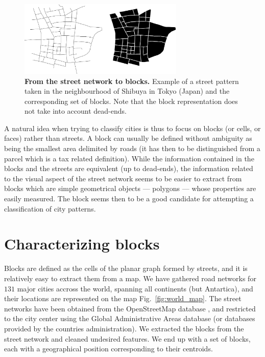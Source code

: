 \begin{figure}
    \centering
    \includegraphics[width=0.7\textwidth]{./gfx/chapter-networks/example.pdf}
    \caption{{\bf From the street network to blocks.} Example of a street pattern
    taken in the neighbourhood of Shibuya in Tokyo (Japan) and the corresponding set
    of blocks. Note that the block representation does not take into account
    dead-ends.  \label{fig:example}} 
\end{figure}

A natural idea when trying to classify cities is thus to focus on blocks (or
cells, or faces) rather than streets. A block can usually be defined without
ambiguity as being the smallest area delimited by roads (it has then to be
distinguished from a parcel which is a tax related definition). While the
information contained in the blocks and the streets are equivalent (up to
dead-ends), the information related to the visual aspect of the street network
seems to be easier to extract from blocks which are simple geometrical objects
--- polygons --- whose properties are easily measured. The block seems then to
be a good candidate for attempting a classification of city patterns. 


\section{Characterizing blocks}

Blocks are defined as the cells of the planar graph formed by streets, and it is
relatively easy to extract them from a map. We have gathered road networks for
$131$ major cities accross the world, spanning all continents (but Antartica),
and their locations are represented on the map Fig.~\ref{fig:world_map}. The
street networks have been obtained from the OpenStreetMap database \cite{OSM},
and restricted to the city center using the Global Administrative Areas database
(or databases provided by the countries administration). We extracted the blocks
from the street network and cleaned undesired features. We end up with a set of
blocks, each with a geographical position corresponding to their centroids. 

